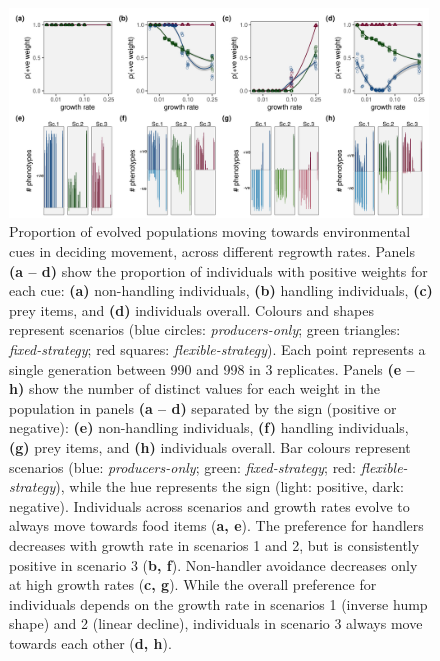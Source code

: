 \documentclass[11pt]{article}
\begin{document}
\begin{figure}[h]
    \centering
    \includegraphics[width=0.99\textwidth]{figures/fig_03_move_weight_end_vals.png}
    \caption{
        Proportion of evolved populations moving towards environmental cues in deciding movement, across different regrowth rates.
        Panels \textbf{(a -- d)} show the proportion of individuals with positive weights for each cue: \textbf{(a)} non-handling individuals, \textbf{(b)} handling individuals, \textbf{(c)} prey items, and \textbf{(d)} individuals overall.
        Colours and shapes represent scenarios (blue circles: \textit{producers-only}; green triangles: \textit{fixed-strategy}; red squares: \textit{flexible-strategy}).
        Each point represents a single generation between 990 and 998 in 3 replicates.
        Panels \textbf{(e -- h)} show the number of distinct values for each weight in the population in panels \textbf{(a -- d)} separated by the sign (positive or negative): \textbf{(e)} non-handling individuals, \textbf{(f)} handling individuals, \textbf{(g)} prey items, and \textbf{(h)} individuals overall.
        Bar colours represent scenarios (blue: \textit{producers-only}; green: \textit{fixed-strategy}; red: \textit{flexible-strategy}), while the hue represents the sign (light: positive, dark: negative).
        Individuals across scenarios and growth rates evolve to always move towards food items (\textbf{a, e}).
        The preference for handlers decreases with growth rate in scenarios 1 and 2, but is consistently positive in scenario 3 (\textbf{b, f}).
        Non-handler avoidance decreases only at high growth rates (\textbf{c, g}).
        While the overall preference for individuals depends on the growth rate in scenarios 1 (inverse hump shape) and 2 (linear decline), individuals in scenario 3 always move towards each other (\textbf{d, h}).
    }
    \label{fig:figure_pipeline}
\end{figure}
\end{document}
